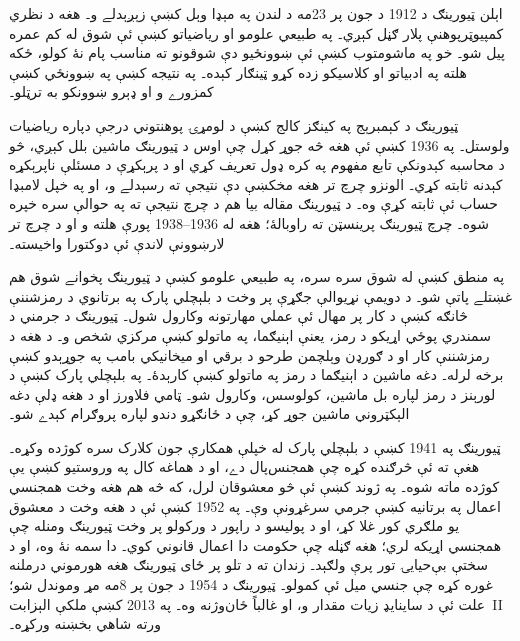 \documentclass[../../../include/open-logic-section]{subfiles}
\begin{document}


اېلن ټيورينګ د 1912 د جون پر 23مه
د لندن په مېډا وېل کښې زېږېدلے و۔
هغه د نظري کمپيوټرپوهنې پلار ګڼل
کېږي۔ په طبيعي علومو او رياضياتو
کښې ئې شوق له کم عمره پيل شو۔
خو په ماشومتوب کښې ئې ښوونځيو
دې شوقونو ته مناسب پام نۀ کولو،
ځکه هلته په ادبياتو او کلاسيکو
زده کړو ټينګار کېده۔ په نتيجه
کښې په ښوونځي کښې کمزورے و او
ډېرو ښوونکو به ترټلو۔


ټيورينګ د کېمبرېج په کينګز کالج کښې
د لومړۍ پوهنتوني درجې دپاره
رياضيات ولوستل۔ په 1936 کښې ئې
هغه څه جوړ کړل چې اوس د ټيورينګ
ماشين بلل کېږي، څو د محاسبه
کېدونکې تابع مفهوم په کره ډول
تعريف کړي او د پرېکړې د مسئلې
ناپرېکړه کېدنه ثابته کړي۔ الونزو
چرچ تر هغه مخکښې دې نتيجې ته
رسېدلے و، او په خپل لامبډا حساب
ئې ثابته کړې وه۔ د ټيورينګ مقاله
بيا هم د چرچ نتيجې ته په حوالې
سره خپره شوه۔ چرچ ټيورينګ
پرينسټن ته راوبالۀ؛ هغه له
1936--1938 پورې هلته و او د
چرچ تر لارښوونې لاندې ئې
دوکتورا واخيسته۔

په منطق کښې له شوق سره سره، په طبيعي
علومو کښې د ټيورينګ پخوانے شوق هم
غښتلے پاتې شو۔ د دويمې نړيوالې
جګړې پر وخت د بلېچلي پارک په
برتانوي د رمزشننې څانګه کښې د
کار پر مهال ئې عملي مهارتونه
وکارول شول۔ ټيورينګ د جرمني د
سمندري پوځي اړيکو د رمز، يعنې
اېنيګما، په ماتولو کښې مرکزي
شخص و۔ د هغه د رمزشننې کار او د ګورډن وېلچمن طرحو د برقي او ميخانيکي بامب په جوړېدو کښې برخه لرله۔ دغه ماشين د اېنيګما د رمز په ماتولو کښې کارېدۀ۔ په بلېچلي پارک کښې د لورېنز د رمز لپاره بل ماشين، کولوسس، وکارول شو۔ ټامي فلاورز او د هغه ډلې دغه الېکټروني ماشين جوړ کړ، چې د ځانګړو دندو لپاره پروګرام کېدے شو۔

ټيورينګ په 1941 کښې د بلېچلي پارک له خپلې همکارې جون کلارک سره کوژده وکړه۔ هغې ته ئې څرګنده کړه چې همجنس‌پال دے، او د هماغه کال په وروستيو کښې يې کوژده ماته شوه۔ په ژوند کښې ئې
څو معشوقان لرل، که څه هم هغه
وخت همجنسي اعمال په برتانيه کښې
جرمي سرغړونې وې۔ په 1952 کښې
ئې د هغه وخت د معشوق يو ملګري
کور غلا کړ، او د پوليسو د راپور
د ورکولو پر وخت ټيورينګ ومنله
چې همجنسي اړيکه لري؛ هغه ګڼله
چې حکومت دا اعمال قانوني کوي۔
دا سمه نۀ وه، او د سختې
بې‌حيايۍ تور پرې ولګېد۔ زندان
ته د تلو پر ځای ټيورينګ هغه
هورموني درملنه غوره کړه چې
جنسي ميل ئې کمولو۔ ټيورينګ د
1954 د جون پر 8مه مړ وموندل
شو؛ علت ئې د ساينايډ زيات مقدار
و، او غالباً ځان‌وژنه وه۔ په
2013 کښې ملکې الېزابت~II ورته
شاهي بخښنه ورکړه۔
\end{document}
